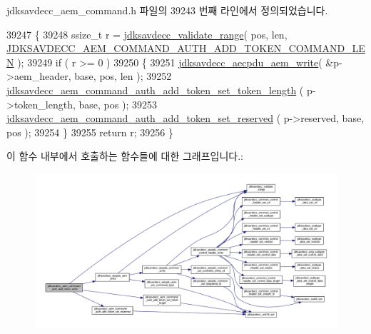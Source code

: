 jdksavdecc\+\_\+aem\+\_\+command.\+h 파일의 39243 번째 라인에서 정의되었습니다.


\begin{DoxyCode}
39247 \{
39248     ssize\_t r = \hyperlink{group__util_ga9c02bdfe76c69163647c3196db7a73a1}{jdksavdecc\_validate\_range}( pos, len, 
      \hyperlink{group__command__auth__add__token_gad1298ed4a1b7f5d8f13b7a16a0ddbd83}{JDKSAVDECC\_AEM\_COMMAND\_AUTH\_ADD\_TOKEN\_COMMAND\_LEN} );
39249     \textcolor{keywordflow}{if} ( r >= 0 )
39250     \{
39251         \hyperlink{group__aecpdu__aem_gad658e55771cce77cecf7aae91e1dcbc5}{jdksavdecc\_aecpdu\_aem\_write}( &p->aem\_header, base, pos, len );
39252         \hyperlink{group__command__auth__add__token_ga981629b56b5f28bf06395231ef9a482c}{jdksavdecc\_aem\_command\_auth\_add\_token\_set\_token\_length}
      ( p->token\_length, base, pos );
39253         \hyperlink{group__command__auth__add__token_ga6a132981be80b52da7586e6607427985}{jdksavdecc\_aem\_command\_auth\_add\_token\_set\_reserved}
      ( p->reserved, base, pos );
39254     \}
39255     \textcolor{keywordflow}{return} r;
39256 \}
\end{DoxyCode}


이 함수 내부에서 호출하는 함수들에 대한 그래프입니다.\+:
\nopagebreak
\begin{figure}[H]
\begin{center}
\leavevmode
\includegraphics[width=350pt]{group__command__auth__add__token_ga446d2a38a15595f3801a8b3a82d34be6_cgraph}
\end{center}
\end{figure}


